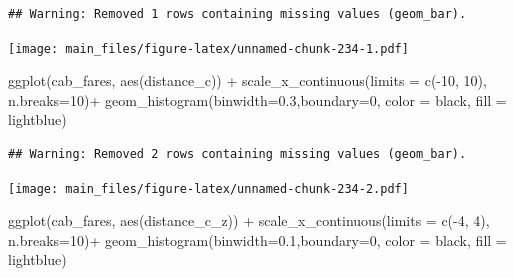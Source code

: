 \documentclass[
]{book}
\newenvironment{Shaded}{\begin{snugshade}}{\end{snugshade}}
\newcommand{\AttributeTok}[1]{\textcolor[rgb]{0.77,0.63,0.00}{#1}}
\newcommand{\DecValTok}[1]{\textcolor[rgb]{0.00,0.00,0.81}{#1}}
\newcommand{\FloatTok}[1]{\textcolor[rgb]{0.00,0.00,0.81}{#1}}
\newcommand{\FunctionTok}[1]{\textcolor[rgb]{0.00,0.00,0.00}{#1}}
\newcommand{\NormalTok}[1]{#1}
\newcommand{\SpecialCharTok}[1]{\textcolor[rgb]{0.00,0.00,0.00}{#1}}
\newcommand{\StringTok}[1]{\textcolor[rgb]{0.31,0.60,0.02}{#1}}
\begin{document}
\begin{verbatim}
## Warning: Removed 1 rows containing missing values (geom_bar).
\end{verbatim}

\texttt{[image: main\_files/figure-latex/unnamed-chunk-234-1.pdf]}

\begin{Shaded}
\begin{Highlighting}[]
\FunctionTok{ggplot}\NormalTok{(cab\_fares, }\FunctionTok{aes}\NormalTok{(distance\_c)) }\SpecialCharTok{+}
        \FunctionTok{scale\_x\_continuous}\NormalTok{(}\AttributeTok{limits =} \FunctionTok{c}\NormalTok{(}\SpecialCharTok{{-}}\DecValTok{10}\NormalTok{, }\DecValTok{10}\NormalTok{), }\AttributeTok{n.breaks=}\DecValTok{10}\NormalTok{)}\SpecialCharTok{+}
        \FunctionTok{geom\_histogram}\NormalTok{(}\AttributeTok{binwidth=}\FloatTok{0.3}\NormalTok{,}\AttributeTok{boundary=}\DecValTok{0}\NormalTok{,}
                       \AttributeTok{color =} \StringTok{\textquotesingle{}black\textquotesingle{}}\NormalTok{,}
                       \AttributeTok{fill =} \StringTok{\textquotesingle{}lightblue\textquotesingle{}}\NormalTok{)}
\end{Highlighting}
\end{Shaded}

\begin{verbatim}
## Warning: Removed 2 rows containing missing values (geom_bar).
\end{verbatim}

\texttt{[image: main\_files/figure-latex/unnamed-chunk-234-2.pdf]}

\begin{Shaded}
\begin{Highlighting}[]
\FunctionTok{ggplot}\NormalTok{(cab\_fares, }\FunctionTok{aes}\NormalTok{(distance\_c\_z)) }\SpecialCharTok{+}
        \FunctionTok{scale\_x\_continuous}\NormalTok{(}\AttributeTok{limits =} \FunctionTok{c}\NormalTok{(}\SpecialCharTok{{-}}\DecValTok{4}\NormalTok{, }\DecValTok{4}\NormalTok{), }\AttributeTok{n.breaks=}\DecValTok{10}\NormalTok{)}\SpecialCharTok{+}
        \FunctionTok{geom\_histogram}\NormalTok{(}\AttributeTok{binwidth=}\FloatTok{0.1}\NormalTok{,}\AttributeTok{boundary=}\DecValTok{0}\NormalTok{,}
                       \AttributeTok{color =} \StringTok{\textquotesingle{}black\textquotesingle{}}\NormalTok{,}
                       \AttributeTok{fill =} \StringTok{\textquotesingle{}lightblue\textquotesingle{}}\NormalTok{)}
\end{Highlighting}
\end{Shaded}
\end{document}

